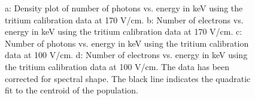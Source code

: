 \begin{figure}[h!]
\caption{a: Density plot of number of photons vs. energy in keV using the tritium calibration data at 170 V/cm. b: Number of electrons vs. energy in keV using the tritium calibration data at 170 V/cm. c: Number of photons vs. energy in keV using the tritium calibration data at 100 V/cm. d: Number of electrons vs. energy in keV using the tritium calibration data at 100 V/cm. The data has been corrected for spectral shape. The black line indicates the quadratic fit to the centroid of the population. }
\label{fig:Raw_Quanta}
\end{figure}
\renewcommand{\baselinestretch}{2}
\small\normalsize


%
\renewcommand{\baselinestretch}{1}
\small\normalsize
\begin{figure}[h!]\centering
 
\hfill
{}

\bigskip


\end{figure}
